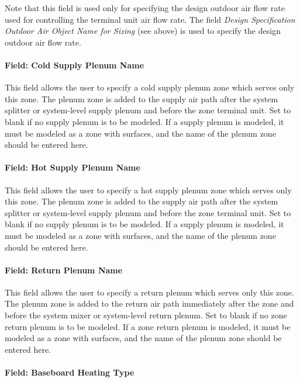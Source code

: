 Note that this field is used only for specifying the design outdoor air flow rate used for controlling the terminal unit air flow rate. The field \emph{Design Specification Outdoor Air Object Name for Sizing} (see above) is used to specify the design outdoor air flow rate.

\paragraph{Field: Cold Supply Plenum Name}\label{field-cold-supply-plenum-name}

This field allows the user to specify a cold supply plenum zone which serves only this zone. The plenum zone is added to the supply air path after the system splitter or system-level supply plenum and before the zone terminal unit. Set to blank if no supply plenum is to be modeled. If a supply plenum is modeled, it must be modeled as a zone with surfaces, and the name of the plenum zone should be entered here.

\paragraph{Field: Hot Supply Plenum Name}\label{field-hot-supply-plenum-name}

This field allows the user to specify a hot supply plenum zone which serves only this zone. The plenum zone is added to the supply air path after the system splitter or system-level supply plenum and before the zone terminal unit. Set to blank if no supply plenum is to be modeled. If a supply plenum is modeled, it must be modeled as a zone with surfaces, and the name of the plenum zone should be entered here.

\paragraph{Field: Return Plenum Name}\label{field-return-plenum-name-5}

This field allows the user to specify a return plenum which serves only this zone. The plenum zone is added to the return air path immediately after the zone and before the system mixer or system-level return plenum. Set to blank if no zone return plenum is to be modeled. If a zone return plenum is modeled, it must be modeled as a zone with surfaces, and the name of the plenum zone should be entered here.

\paragraph{Field: Baseboard Heating Type}\label{field-baseboard-heating-type-11}

